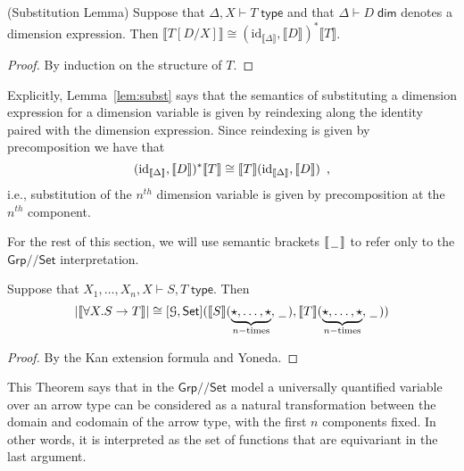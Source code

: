 \documentclass[a4paper,UKenglish]{lipics}
\theoremstyle{plain}
\newcommand{\msf}[1]{\mathsf{#1}} %
\newcommand{\Grp}{\msf{Grp}}
\newcommand{\Set}{\msf{Set}}
\newcommand{\blank}{\, \underline{\hspace{2mm}} \,}
\newcommand{\GroupSet}[1]{[#1,\Set]}
\newcommand{\Lslice}[1]{#1/\!/\Set}
\newcommand{\GrpSet}{\Lslice{\Grp}}
\newcommand{\sem}[1]{\ensuremath{\llbracket #1 \rrbracket}}
\newcommand{\Dj}[2]{#1 \vdash #2 \; \msf{ dim}}
\newcommand{\Dim}{D}
\newcommand{\id}{\mathrm{id}}
\begin{document}
\begin{lemma}(Substitution Lemma)
\label{lem:subst}
Suppose that $\Delta, X \vdash T \; \msf{ type}$ and that $\Dj\Delta \Dim$ denotes a dimension expression. Then $\sem{T[D/X]} \cong (\id_{\sem{\Delta}} , \sem{D})^\ast \sem{T}$.
\end{lemma}
\begin{proof}
 By induction on the structure of $T$.
\end{proof}


Explicitly, Lemma~\ref{lem:subst} says that the semantics of substituting a dimension expression for a dimension variable is given by reindexing along the identity paired with the dimension expression. Since reindexing is given by precomposition we have that
\[
 (\id_{\sem{\Delta}} , \sem{D})^\ast \sem{T} \cong \sem{T}(\id_{\sem{\Delta}}, \sem{D}) \enspace \text,
\]
i.e., substitution of the $n^{th}$ dimension variable is given by precomposition at the $n^{th}$ component.

For the rest of this section, we will use semantic brackets $\sem{\, \underline{\hspace{2mm}}\, }$ to refer only to the $\GrpSet$ interpretation.

\begin{theorem}
\label{thm:allArrows}
 Suppose that $X_1, \ldots, X_n, X \vdash S,T \; \msf{ type}$. Then
\[
|\sem{\forall X. S \rightarrow T}| \cong \GroupSet{\mathcal{G}} (\sem{S}(\underbrace{\star,\ldots,\star}_{n-\text{times}}, \blank),\sem{T}(\underbrace{\star,\ldots,\star}_{n-\text{times}}, \blank))
\]
\end{theorem}
\begin{proof}
By the Kan extension formula and Yoneda.
\end{proof}

This Theorem says that in the $\GrpSet$ model a universally quantified variable over an arrow type can be considered as a natural transformation between the domain and codomain of the arrow type, with the first $n$ components fixed.
In other words, it is interpreted as the set of functions that are equivariant
in the last argument.
\end{document}
